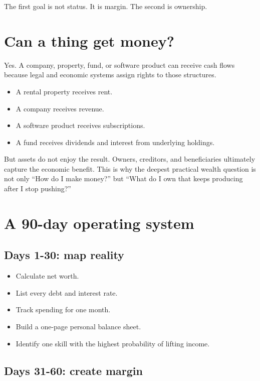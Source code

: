\documentclass[11pt,openany]{book}
\begin{document}
The first goal is not status. It is margin. The second is ownership.

\chapter{Can a thing get money?}

Yes. A company, property, fund, or software product can receive cash flows because legal and economic systems assign rights to those structures.

\begin{itemize}
  \item A rental property receives rent.
  \item A company receives revenue.
  \item A software product receives subscriptions.
  \item A fund receives dividends and interest from underlying holdings.
\end{itemize}

But assets do not enjoy the result. Owners, creditors, and beneficiaries ultimately capture the economic benefit. This is why the deepest practical wealth question is not only ``How do I make money?'' but ``What do I own that keeps producing after I stop pushing?''

\chapter{A 90-day operating system}

\section{Days 1-30: map reality}

\begin{itemize}
  \item Calculate net worth.
  \item List every debt and interest rate.
  \item Track spending for one month.
  \item Build a one-page personal balance sheet.
  \item Identify one skill with the highest probability of lifting income.
\end{itemize}

\section{Days 31-60: create margin}
\end{document}

